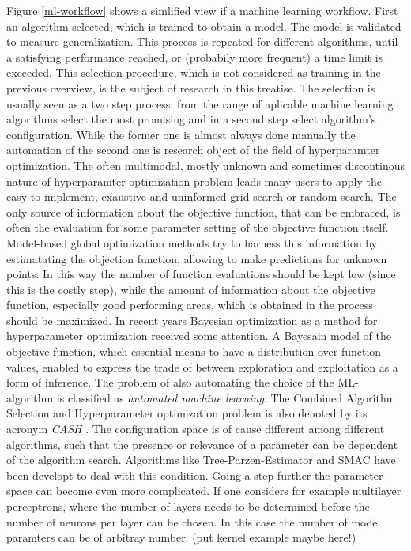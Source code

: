 \documentclass[english]{article}
\begin{document}
Figure \ref{ml-workflow} shows a simlified view if a machine learning workflow. First an algorithm selected, which is trained to obtain a model. The model is validated to measure generalization. This process is repeated for different algorithms, until a satisfying performance reached, or (probabily more frequent) a time limit is exceeded. This selection procedure, which is not considered as training in the previous overview, is the subject of research in this treatise.
The selection is usually seen as a two step process: from the range of aplicable machine learning algorithms select the most promising and in a second step select algorithm's configuration. While the former one is almost always done manually the automation of the second one is research object of the field of hyperparamter optimization.
The often multimodal, mostly unknown and sometimes discontinous nature of hyperparamter optimization problem leads many users to apply the easy to implement, exaustive and uninformed grid search or random search. The only source of information about the objective function, that can be embraced, is often the evaluation for some parameter setting of the objective function itself. Model-based global optimization methods try to harness this information by estimatating the objection function, allowing to make predictions for unknown points. In this way the number of function evaluations should be kept low (since this is the costly step), while the amount of information about the objective function, especially good performing areas, which is obtained in the process should be maximized.
In recent years Bayesian optimization as a method for hyperparameter optimization received some attention. A Bayesain model of the objective function, which essential means to have a distribution over function values, enabled to express the trade of between exploration and exploitation as a form of inference.
The problem of also automating the choice of the ML-algorithm is classified as \textit{automated machine learning}. The Combined Algorithm Selection and Hyperparameter optimization problem is also denoted by its acronym \textit{CASH} \cite{feurer_efficient_2015}. The configuration space is of cause different among different algorithms, such that the presence or relevance of a parameter can be dependent of the algorithm search. Algorithms like Tree-Parzen-Estimator and SMAC have been developt to deal with this condition.
Going a step further the parameter space can become even more complicated. If one considers for example multilayer perceptrons, where the number of layers needs to be determined before the number of neurons per layer can be chosen. In this case the number of model paramters can be of arbitray number. (put kernel example maybe here!)
\end{document}

